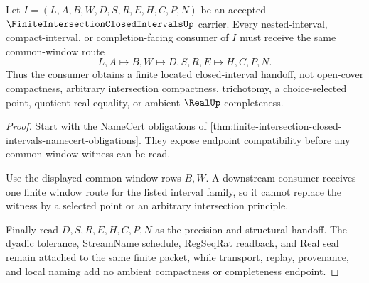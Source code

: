 \begin{theorem}
\label{thm:finite-intersection-closed-intervals-common-window-handoff}
Let $I=(L,A,B,W,D,S,R,E,H,C,P,N)$ be an accepted $\FiniteIntersectionClosedIntervalsUp$ carrier. Every nested-interval, compact-interval, or completion-facing consumer of $I$ must receive the same common-window route
$$
L,A \longmapsto B,W \longmapsto D,S,R,E \longmapsto H,C,P,N .
$$
Thus the consumer obtains a finite located closed-interval handoff, not open-cover compactness, arbitrary intersection compactness, trichotomy, a choice-selected point, quotient real equality, or ambient $\RealUp$ completeness.
\end{theorem}
\begin{proof}
Start with the NameCert obligations of \autoref{thm:finite-intersection-closed-intervals-namecert-obligations}. They expose endpoint compatibility before any common-window witness can be read.

Use the displayed common-window rows $B,W$. A downstream consumer receives one finite window route for the listed interval family, so it cannot replace the witness by a selected point or an arbitrary intersection principle.

Finally read $D,S,R,E,H,C,P,N$ as the precision and structural handoff. The dyadic tolerance, StreamName schedule, RegSeqRat readback, and Real seal remain attached to the same finite packet, while transport, replay, provenance, and local naming add no ambient compactness or completeness endpoint.
\end{proof}


\begin{closurestatus}{\FiniteIntersectionClosedIntervalsUp}
  \theoryclosure{\seedClosure}
  \formalstatus{\unformalizedV}
\end{closurestatus}
